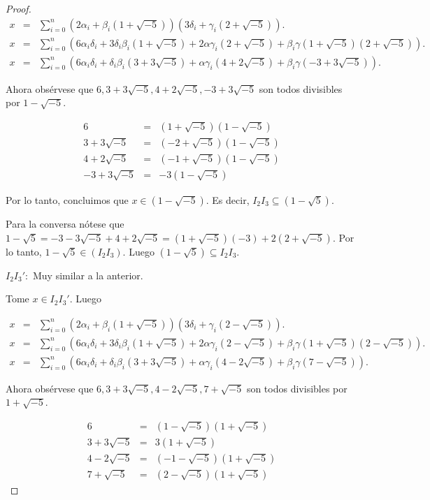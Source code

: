 \documentclass[letter,twoside,12pt]{article}
\begin{document}
\begin{enumerate}[label=\textbf{(\alph*)}]
\begin{proof}
\begin{eqnarray}
x &=& \sum_{i=0}^n (2\alpha_i+ \beta_i(1+\sqrt{-5}))(3\delta_i+ \gamma_i(2+\sqrt{-5})). \nonumber
\\x &=& \sum_{i=0}^n (6\alpha_i\delta_i+ 3\delta_i\beta_i(1+\sqrt{-5})+2\alpha\gamma_i(2+\sqrt{-5})+\beta_i\gamma(1+\sqrt{-5})(2+\sqrt{-5})). \nonumber
\\x &=& \sum_{i=0}^n (6\alpha_i\delta_i+ \delta_i\beta_i(3+3\sqrt{-5})+\alpha\gamma_i(4+2\sqrt{-5})+\beta_i\gamma(-3+3\sqrt{-5})). \nonumber
\end{eqnarray}

Ahora obsérvese que $ 6, 3+3\sqrt{-5},4+2\sqrt{-5},-3+3\sqrt{-5}  $ son todos divisibles por $ 1-\sqrt{-5} $.

\begin{eqnarray}
6 &=& (1+\sqrt{-5})(1-\sqrt{-5}) \nonumber
\\3+3\sqrt{-5} &=& (-2+\sqrt{-5})(1-\sqrt{-5}) \nonumber
\\4+2\sqrt{-5} &=& (-1+\sqrt{-5})(1-\sqrt{-5}) \nonumber
\\-3+3\sqrt{-5} &=& -3(1-\sqrt{-5}) \nonumber
\end{eqnarray}

Por lo tanto, concluimos que $ x \in (1-\sqrt{-5}) $. Es decir, $I_2I_3 \subseteq (1-\sqrt{5}) $. 

Para la conversa nótese que $ 1-\sqrt{5} = -3-3\sqrt{-5}+4+2\sqrt{-5} = (1+\sqrt{-5})(-3)+2(2+\sqrt{-5})$. Por lo tanto, $ 1-\sqrt{5} \in (I_2I_3)$. Luego $ (1-\sqrt{5}) \subseteq I_2I_3 $.

$ I_2I_3': $ Muy similar a la anterior.

Tome $ x \in I_2I_3' $. Luego

\begin{eqnarray}
x &=& \sum_{i=0}^n (2\alpha_i+ \beta_i(1+\sqrt{-5}))(3\delta_i+ \gamma_i(2-\sqrt{-5})). \nonumber
\\x &=& \sum_{i=0}^n (6\alpha_i\delta_i+ 3\delta_i\beta_i(1+\sqrt{-5})+2\alpha\gamma_i(2-\sqrt{-5})+\beta_i\gamma(1+\sqrt{-5})(2-\sqrt{-5})). \nonumber
\\x &=& \sum_{i=0}^n (6\alpha_i\delta_i+ \delta_i\beta_i(3+3\sqrt{-5})+\alpha\gamma_i(4-2\sqrt{-5})+\beta_i\gamma(7-\sqrt{-5})). \nonumber
\end{eqnarray}

Ahora obsérvese que $ 6, 3+3\sqrt{-5},4-2\sqrt{-5},7+\sqrt{-5} $ son todos divisibles por $ 1+\sqrt{-5} $.

\begin{eqnarray}
6 &=& (1-\sqrt{-5})(1+\sqrt{-5}) \nonumber
\\3+3\sqrt{-5} &=& 3(1+\sqrt{-5}) \nonumber
\\4-2\sqrt{-5} &=& (-1-\sqrt{-5})(1+\sqrt{-5}) \nonumber
\\7+\sqrt{-5} &=& (2-\sqrt{-5})(1+\sqrt{-5}) \nonumber
\end{eqnarray}


\end{proof}
\end{enumerate}
\end{document}
